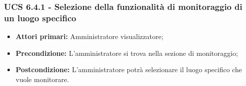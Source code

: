 \subsubsection{UCS 6.4.1 - Selezione della funzionalità di monitoraggio di un luogo specifico}
\begin{itemize}
\item \textbf{Attori primari:} Amministratore visualizzatore;
\item \textbf{Precondizione:} L'amministratore si trova nella sezione di monitoraggio;
\item \textbf{Postcondizione:} L'amministratore potrà selezionare il luogo specifico che vuole monitorare.
\end{itemize}



